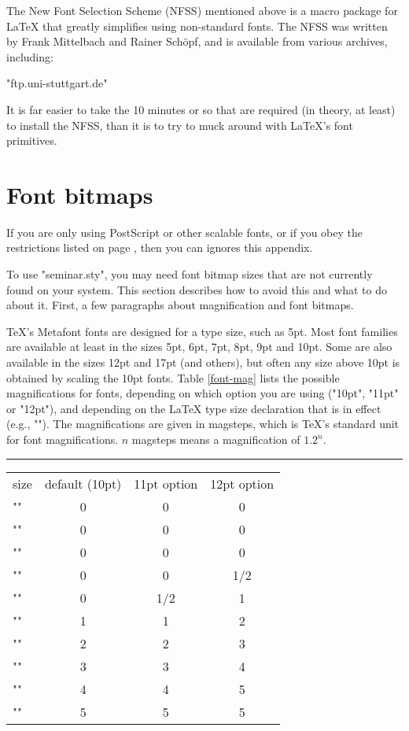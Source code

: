 \begin{slide}
The New Font Selection Scheme (NFSS) mentioned above is a macro package for
\LaTeX{} that greatly simplifies using non-standard fonts. The NFSS was
written by Frank Mittelbach and Rainer Sch\"opf, and is available from various
archives, including:
\begin{center}
"ftp.uni-stuttgart.de"
\end{center}
It is far easier to take the 10 minutes or so that are required (in theory, at
least) to install the NFSS, than it is to try to muck around with \LaTeX's
font primitives.


\section{Font bitmaps\label{bitmaps}}

If you are only using PostScript or other scalable fonts, or if you obey the
restrictions listed on page \pageref{font-res}, then you can ignores this
appendix.

To use "seminar.sty", you may need font bitmap sizes that are not currently
found on your system. This section describes how to avoid this and what to do
about it. First, a few paragraphs about magnification and font bitmaps.

\TeX's Metafont fonts are designed for a type size, such as 5pt. Most font
families are available at least in the sizes 5pt, 6pt, 7pt, 8pt, 9pt and 10pt.
Some are also available in the sizes 12pt and 17pt (and others), but often any
size above 10pt is obtained by scaling the 10pt fonts. Table \ref{font-mag}
lists the possible magnifications for fonts, depending on which option you are
using ("10pt", "11pt" or "12pt"), and depending on the \LaTeX{} type size
declaration that is in effect (e.g., "\small"). The magnifications are given
in magsteps, which is \TeX's standard unit for font magnifications. $n$
magsteps means a magnification of $1.2^n$.

\begin{table}
\hrule  height 1pt\relax
\begin{center}
\begin{tabular}{l|c|c|c|}
\multicolumn{1}{l}{size} &
\multicolumn{1}{c}{default (10pt)} &
  \multicolumn{1}{c}{11pt option}  &
  \multicolumn{1}{c}{12pt option}\\
\cline{2-4} "\tiny"       & 0  & 0 & 0\\
\cline{2-4} "\scriptsize" & 0  & 0 & 0\\
\cline{2-4} "\footnotesize" & 0 & 0 & 0 \\
\cline{2-4} "\small"        & 0 & 0 & 1/2 \\
\cline{2-4} "\normalsize" & 0 & 1/2 & 1 \\
\cline{2-4} "\large"      & 1 & 1 & 2 \\
\cline{2-4} "\Large"      & 2 & 2 & 3 \\
\cline{2-4} "\LARGE"      & 3 & 3 & 4\\
\cline{2-4} "\huge"       & 4 & 4 & 5\\
\cline{2-4} "\Huge"       & 5 & 5 & 5\\
\cline{2-4}
\end{tabular}


\end{center}
\end{table}
\end{slide}
